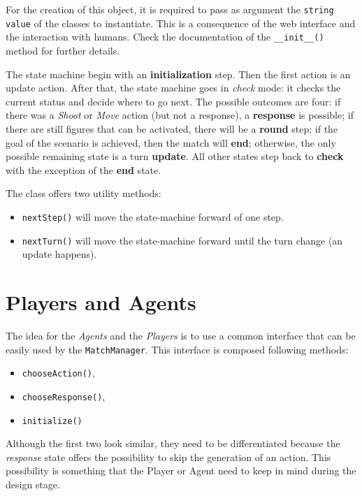 \documentclass[a4paper]{report}
\begin{document}
	For the creation of this object, it is required to pass as argument the \texttt{string value} of the classes to instantiate. This is a consequence of the web interface and the interaction with humans. Check the documentation of the \texttt{\_\_init\_\_()} method for further details.
	
	The state machine begin with an \textbf{initialization} step. Then the first action is an update action. After that, the state machine goes in \textit{check} mode: it checks the current status and decide where to go next. The possible outcomes are four: if there was a \textit{Shoot} or \textit{Move} action (but not a response), a \textbf{response} is possible; if there are still figures that can be activated, there will be a \textbf{round} step; if the goal of the scenario is achieved, then the match will \textbf{end}; otherwise, the only possible remaining state is a turn \textbf{update}. All other states step back to \textbf{check} with the exception of the \textbf{end} state.

	The class offers two utility methods:
	
	\begin{itemize}
		\item \texttt{nextStep()} will move the state-machine forward of one step.
		\item \texttt{nextTurn()} will move the state-machine forward until the turn change (an update happens).
	\end{itemize}


	\chapter{Players and Agents}

	The idea for the \textit{Agents} and the \textit{Players} is to use a common interface that can be easily used by the \texttt{MatchManager}. This interface is composed following methods:

	\begin{itemize}
		\item \texttt{chooseAction()},
		\item \texttt{chooseResponse()},
		\item \texttt{initialize()}
	\end{itemize}

	Although the first two look similar, they need to be differentiated because the \textit{response} state offers the possibility to skip the generation of an action. This possibility is something that the Player or Agent need to keep in mind during the design stage.
\end{document}
